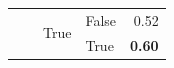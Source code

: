 \begin{tabular}{@{}llllr@{}}
                                                                        &                           & \multirow[c]{2}{*}{True}  & False                     & 0.52 \\
                                                                        &                           &                           & True                      & \textbf{0.60} \\
   \bottomrule                                                                                                                                                   
\end{tabular}

